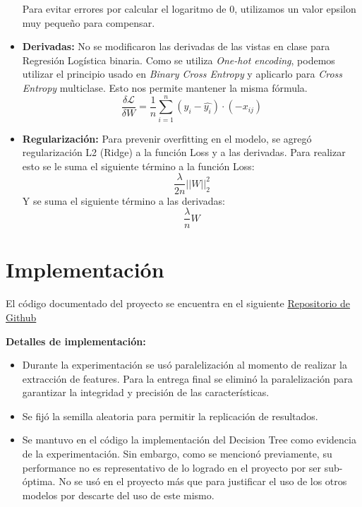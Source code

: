 \documentclass[conference]{IEEEtran}
\begin{document}
\begin{itemize}
Para evitar errores por calcular el logaritmo de $0$, utilizamos un valor epsilon muy pequeño para compensar.

\item \textbf{Derivadas:}
No se modificaron las derivadas de las vistas en clase para Regresión Logística binaria. Como se utiliza \textit{One-hot encoding}, podemos utilizar el principio usado en \textit{Binary Cross Entropy} y aplicarlo para \textit{Cross Entropy} multiclase. Esto nos permite mantener la misma fórmula.
\[\frac{\delta\mathcal{L}}{\delta W} = \frac{1}{n}\sum_{i=1}^n (y_i - \hat{y_i})\cdot (-x_{ij})\]

\item \textbf{Regularización:}
Para prevenir overfitting en el modelo, se agregó regularización L2 (Ridge) a la función Loss y a las derivadas. Para realizar esto se le suma el siguiente término a la función Loss:
\[\frac{\lambda}{2n} ||W||_2^2\]
Y se suma el siguiente término a las derivadas:
\[\frac{\lambda}{n} W\]

\end{itemize}


\section{Implementación}
El código documentado del proyecto se encuentra en el siguiente 
\href{https://github.com/kaloslazo/SupervisedClassification}{Repositorio de Github}


\noindent \textbf{Detalles de implementación:}
\begin{itemize}
\item Durante la experimentación se usó paralelización al momento de realizar la extracción de features. Para la entrega final se eliminó la paralelización para garantizar la integridad y precisión de las características.

\item Se fijó la semilla aleatoria para permitir la replicación de resultados.

\item Se mantuvo en el código la implementación del Decision Tree como evidencia de la experimentación. Sin embargo, como se mencionó previamente, su performance no es representativo de lo logrado en el proyecto por ser sub-óptima. No se usó en el proyecto más que para justificar el uso de los otros modelos por descarte del uso de este mismo.
\end{itemize}
\end{document}
